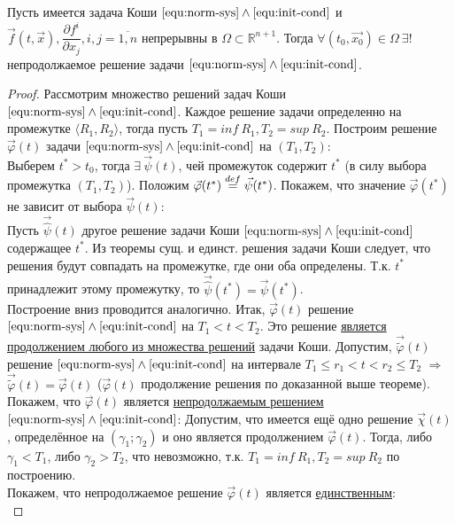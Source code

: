 \begin{theorem}
	Пусть имеется задача Коши $\eqref{equ:norm-sys} \wedge \eqref{equ:init-cond}$ и $\vec{f}(t, \vec{x}), \dfrac{\partial f^i}{\partial x_j}, i, j = \overline{1, n}$ непрерывны в $\Omega \subset \mathbb{R}^{n+1}$. Тогда $\forall (t_0, \vec{x_0}) \in \Omega \ \exists!$ непродолжаемое решение задачи $\eqref{equ:norm-sys} \wedge \eqref{equ:init-cond}$.
\end{theorem}
\begin{proof}
	Рассмотрим множество решений задач Коши $\eqref{equ:norm-sys} \wedge \eqref{equ:init-cond}$. Каждое решение задачи определенно на промежутке $\langle R_1, R_2 \rangle$, тогда пусть $T_1 = inf\ R_1, T_2 = sup\ R_2$. Построим решение $\vec{\varphi}(t)$ задачи $\eqref{equ:norm-sys} \wedge \eqref{equ:init-cond}$ на $(T_1, T_2)$:\\
	Выберем $t^* > t_0$, тогда $\exists\ \vec{\psi}(t)$, чей промежуток содержит $t^*$ (в силу выбора промежутка $(T_1, T_2)$). Положим $\vec{\varphi}(t^*) \stackrel{def}{=} \vec{\psi}(t^*)$. Покажем, что значение $\vec{\varphi}(t^*)$ не зависит от выбора $\vec{\psi}(t)$:\\
	Пусть $\displaystyle \vec{\hat{\psi}}(t)$ другое решение задачи Коши $\eqref{equ:norm-sys} \wedge \eqref{equ:init-cond}$ содержащее $t^*$. Из теоремы сущ. и единст. решения задачи Коши следует, что решения будут совпадать на промежутке, где они оба определены. Т.к. $t^*$ принадлежит этому промежутку, то $\vec{\hat{\psi}}(t^*) = \vec{\psi}(t^*)$.\\ 
	Построение вниз проводится аналогично. Итак, $\vec{\varphi}(t)$ решение $\eqref{equ:norm-sys} \wedge \eqref{equ:init-cond}$ на $T_1 < t < T_2$. Это решение \underline{является продолжением любого из множества решений} задачи Коши. Допустим, $\vec{\widetilde{\varphi}}(t)$ решение $\eqref{equ:norm-sys} \wedge \eqref{equ:init-cond}$ на интервале $T_1 \leq r_1 < t < r_2 \leq T_2$ $\Rightarrow$ $\vec{\widetilde{\varphi}}(t) = \vec{\varphi}(t)$ ($\vec{\varphi}(t)$ продолжение решения по доказанной выше теореме). \\Покажем, что $\vec{\varphi}(t)$ является \underline{непродолжаемым решением} $\eqref{equ:norm-sys} \wedge \eqref{equ:init-cond}$:
	Допустим, что имеется ещё  одно решение $\vec{\chi}(t)$, определённое на $(\gamma_1; \gamma_2)$ и оно является продолжением $\vec{\varphi}(t)$. Тогда, либо $\gamma_1 < T_1$, либо $\gamma_2 > T_2$, что невозможно, т.к. $T_1 = inf\ R_1, T_2 = sup\ R_2$ по построению. \\
	Покажем, что непродолжаемое решение $\vec{\varphi}(t)$ является \underline{единственным}:\\

\end{proof}
